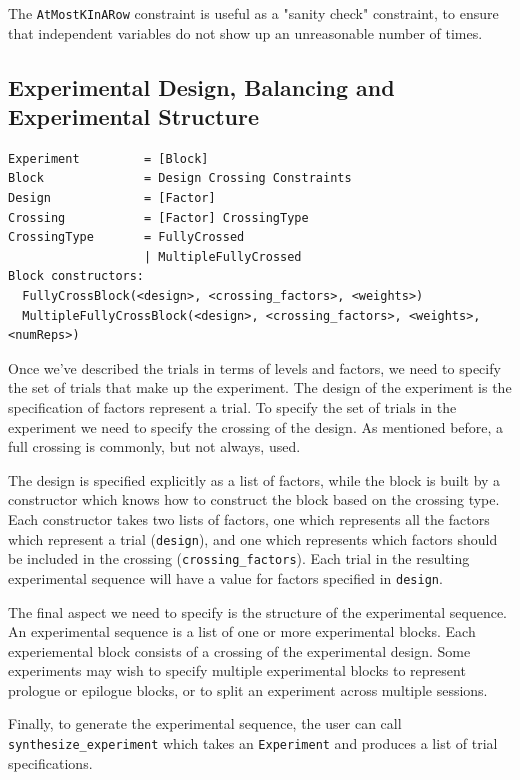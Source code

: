 The \texttt{AtMostKInARow} constraint is useful as a "sanity check" constraint, to ensure that independent variables do not show up an unreasonable number of times.

\subsection{Experimental Design, Balancing and Experimental Structure}

\begin{verbatim}
Experiment         = [Block]
Block              = Design Crossing Constraints
Design             = [Factor]
Crossing           = [Factor] CrossingType
CrossingType       = FullyCrossed
                   | MultipleFullyCrossed
Block constructors:
  FullyCrossBlock(<design>, <crossing_factors>, <weights>)
  MultipleFullyCrossBlock(<design>, <crossing_factors>, <weights>, <numReps>)
\end{verbatim}

Once we've described the trials in terms of levels and factors, we need to specify the set of trials that make up the experiment. The design of the experiment is the specification of factors represent a trial. To specify the set of trials in the experiment we need to specify the crossing of the design. As mentioned before, a full crossing is commonly, but not always, used.

The design is specified explicitly as a list of factors, while the block is built by a constructor which knows how to construct the block based on the crossing type. Each constructor takes two lists of factors, one which represents all the factors which represent a trial (\texttt{design}), and one which represents which factors should be included in the crossing (\texttt{crossing\_factors}). Each trial in the resulting experimental sequence will have a value for factors specified in \texttt{design}.

The final aspect we need to specify is the structure of the experimental sequence. An experimental sequence is a list of one or more experimental blocks. Each experiemental block consists of a crossing of the experimental design. Some experiments may wish to specify multiple experimental blocks to represent prologue or epilogue blocks, or to split an experiment across multiple sessions.

Finally, to generate the experimental sequence, the user can call \texttt{synthesize\_experiment} which takes an \texttt{Experiment} and produces a list of trial specifications.

